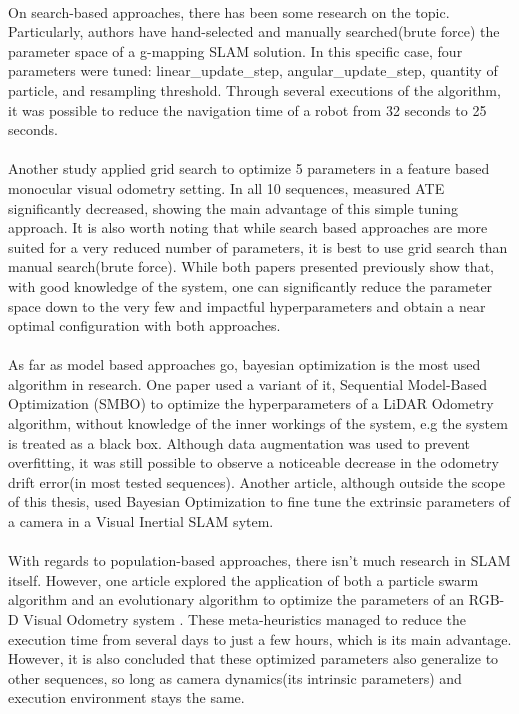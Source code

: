 \paragraph{}On search-based approaches, there has been some research on the topic. Particularly, authors have hand-selected and manually searched(brute force) the parameter space of a g-mapping SLAM solution\cite{ExampleArticle}. In this specific case, four parameters were tuned: linear\_update\_step, angular\_update\_step, quantity of particle, and resampling threshold. Through several executions of the algorithm, it was possible to reduce the navigation time of a robot from 32 seconds to 25 seconds.
\paragraph{}Another study applied grid search to optimize 5 parameters in a feature based monocular visual odometry setting\cite{zheng2020feature}. In all 10 sequences, measured ATE significantly decreased, showing the main advantage of this simple tuning approach. It is also worth noting that while search based approaches are more suited for a very reduced number of parameters, it is best to use grid search than manual search(brute force). While both papers presented previously show that, with good knowledge of the system, one can significantly reduce the parameter space down to the very few and impactful hyperparameters and obtain a near optimal configuration with both approaches.
\paragraph{}As far as model based approaches go, bayesian optimization is the most used algorithm in research. One paper used a variant of it, Sequential Model-Based Optimization (SMBO) to optimize the hyperparameters of a LiDAR Odometry algorithm, without knowledge of the  inner workings of the system, e.g the system is treated as a black box\cite{koide2021automatic}. Although data augmentation was used to prevent overfitting, it was still possible to observe a noticeable decrease in the odometry drift error(in most tested sequences). Another article, although outside the scope of this thesis, used Bayesian Optimization to fine tune the extrinsic parameters of a camera in a Visual Inertial SLAM sytem\cite{chen2018visual}.
\paragraph{}With regards to population-based approaches, there isn't much research in SLAM itself. However, one article explored the application of both a particle swarm algorithm and an evolutionary algorithm to optimize the parameters of an RGB-D Visual Odometry system \cite{kostusiak2019efficiency}. These meta-heuristics managed to reduce the execution time from several days to just a few hours, which is its main advantage. However, it is also concluded that these optimized parameters also generalize to other sequences, so long as camera dynamics(its intrinsic parameters) and execution environment stays the same.

